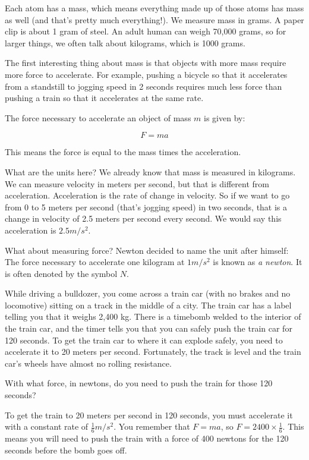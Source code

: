 Each atom has a mass, which means everything made up of those atoms has mass as well (and that's pretty much everything!). We measure mass in grams. A
paper clip is about 1 gram of steel. An adult human can weigh 70,000
grams, so for larger things, we often talk about kilograms, which
is 1000 grams.

The first interesting thing about mass is that objects with more mass
require more force to accelerate. For example, pushing a bicycle so
that it accelerates from a standstill to jogging speed in 2 seconds
requires much less force than pushing a train so that it accelerates
at the same rate.


\begin{mdframed}[style=important, frametitle={Newton's Second Law of Motion}]

The force necessary to accelerate an object of mass $m$ is given by:

$$F = m a$$

This means the force is equal to the mass times the acceleration.

\end{mdframed}

What are the units here? We already know that mass is measured in
kilograms. We can measure velocity in meters per second, but that is
different from acceleration. Acceleration is the rate of change in
velocity. So if we want to go from 0 to 5 meters per second (that's
jogging speed) in two seconds, that is a change in velocity of 2.5
meters per second every second. We would say this acceleration is $2.5
m/s^2$.

What about measuring force? Newton decided to name the unit after
himself: The force necessary to accelerate one kilogram at $1 m/s^2$
is known as \textit{a newton}. It is often denoted by the symbol $N$.

\begin{Exercise}[title={Acceleration}, label=acceleration_train]

While driving a bulldozer, you come across a train car (with no brakes
and no locomotive) sitting on a track in the middle of a city. The train car
has a label telling you that it weighs 2,400 kg. There is a timebomb
welded to the interior of the train car, and the timer tells you that
you can safely push the train car for 120 seconds. To get the train
car to where it can explode safely, you need to accelerate it to 20 meters per
second. Fortunately, the track is level and the train car's wheels have
almost no rolling resistance.

With what force, in newtons, do you need to push the train for those 120 seconds?

\end{Exercise}
\begin{Answer}[ref=acceleration_train]
To get the train to 20 meters per second in 120 seconds, you must
accelerate it with a constant rate of $\frac{1}{6} m/s^2$. You
remember that $F = m a$, so $F = 2400 \times \frac{1}{6}$. This means you
will need to push the train with a force of 400 newtons for the 120 seconds
before the bomb goes off.
\end{Answer}

